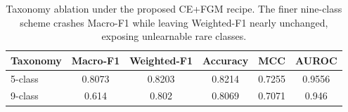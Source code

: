 \begin{table}[!htbp]
\centering
\caption{Taxonomy ablation under the proposed CE+FGM recipe. The finer nine-class scheme crashes Macro-F1 while leaving Weighted-F1 nearly unchanged, exposing unlearnable rare classes.}
\label{tab:taxonomy}
\small
\begin{tabular}{@{}lccccc@{}}
\toprule
\textbf{Taxonomy} & \textbf{Macro-F1} & \textbf{Weighted-F1} & \textbf{Accuracy} & \textbf{MCC} & \textbf{AUROC} \\
\midrule
5-class & 0.8073 & 0.8203 & 0.8214 & 0.7255 & 0.9556 \\
9-class & 0.614 & 0.802 & 0.8069 & 0.7071 & 0.946 \\
\bottomrule
\end{tabular}
\end{table}